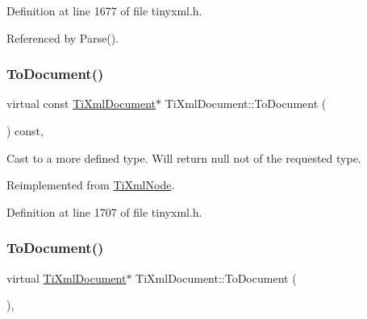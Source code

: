Definition at line 1677 of file tinyxml.\+h.



Referenced by Parse().

\hypertarget{class_ti_xml_document_a468e582640e3c4f740f7168d8b4a6e4a}{}\label{class_ti_xml_document_a468e582640e3c4f740f7168d8b4a6e4a} 
\subsubsection{\texorpdfstring{To\+Document()}{ToDocument()}\hspace{0.1cm}{\footnotesize\ttfamily [1/2]}}
{\footnotesize\ttfamily virtual const \hyperlink{class_ti_xml_document}{Ti\+Xml\+Document}$\ast$ Ti\+Xml\+Document\+::\+To\+Document (\begin{DoxyParamCaption}{ }\end{DoxyParamCaption}) const\hspace{0.3cm}{\ttfamily [inline]}, {\ttfamily [virtual]}}



Cast to a more defined type. Will return null not of the requested type. 



Reimplemented from \hyperlink{class_ti_xml_node_a775a904618cad6e4a8049bda4f5a6aa9}{Ti\+Xml\+Node}.



Definition at line 1707 of file tinyxml.\+h.

\hypertarget{class_ti_xml_document_a1025d942a1f328fd742d545e37efdd42}{}\label{class_ti_xml_document_a1025d942a1f328fd742d545e37efdd42} 
\subsubsection{\texorpdfstring{To\+Document()}{ToDocument()}\hspace{0.1cm}{\footnotesize\ttfamily [2/2]}}
{\footnotesize\ttfamily virtual \hyperlink{class_ti_xml_document}{Ti\+Xml\+Document}$\ast$ Ti\+Xml\+Document\+::\+To\+Document (\begin{DoxyParamCaption}{ }\end{DoxyParamCaption})\hspace{0.3cm}{\ttfamily [inline]}, {\ttfamily [virtual]}}



